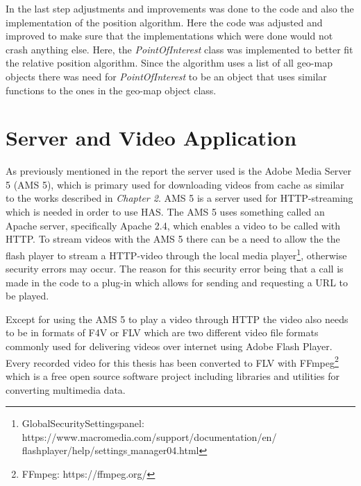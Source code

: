 In the last step adjustments and improvements was done to the code and also the implementation of the position algorithm. Here the code was adjusted and improved to make sure that the implementations which were done would not crash anything else. Here, the \textit{PointOfInterest} class was implemented to better fit the relative position algorithm. Since the algorithm uses a list of all geo-map objects there was need for \textit{PointOfInterest} to be an object that uses similar functions to the ones in the geo-map object class. 

\section{Server and Video Application}
\label{sec:server}

As previously mentioned in the report the server used is the Adobe Media Server 5 (AMS 5), which is primary used for downloading videos from cache as similar to the works described in \textit{Chapter 2}. AMS 5 is a server used for HTTP-streaming which is needed in order to use HAS. The AMS 5 uses something called an Apache server, specifically Apache 2.4, which enables a video to be called with HTTP. To stream videos with the AMS 5 there can be a need to allow the the flash player to stream a HTTP-video through the local media player\footnote{Global\:Security\:Settings\:panel: https://www.macromedia.com/support/documentation/en/\\flashplayer/help/settings$\_$manager04.html}, otherwise security errors may occur. The reason for this security error being that a call is made in the code to a plug-in which allows for sending and requesting a URL to be played.

Except for using the AMS 5 to play a video through HTTP the video also needs to be in formats of F4V or FLV which are two different video file formats commonly used for delivering videos over internet using Adobe Flash Player. Every recorded video for this thesis has been converted to FLV with FFmpeg\footnote{FFmpeg: https://ffmpeg.org/} which is a free open source software project including libraries and utilities for converting multimedia data.


